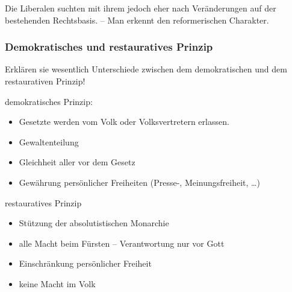 Die Liberalen suchten mit ihrem  jedoch
eher nach Veränderungen auf der bestehenden Rechtsbasis. -- Man
erkennt den reformerischen Charakter.


\subsubsection{Demokratisches und restauratives Prinzip}

\begin{aufgabe}
Erklären sie wesentlich Unterschiede zwischen dem demokratischen und
dem restaurativen Prinzip! 
\end{aufgabe}

\noindent demokratisches Prinzip:

\begin{itemize}
\item Gesetzte werden vom Volk oder Volksvertretern erlassen.
\item Gewaltenteilung
\item Gleichheit aller vor dem Gesetz
\item Gewährung persönlicher Freiheiten (Presse-, Meinungsfreiheit,
\dots) 
\end{itemize}

\noindent restauratives Prinzip

\begin{itemize}
\item Stützung der absolutistischen Monarchie
\item alle Macht beim Fürsten -- Verantwortung nur vor Gott
\item Einschränkung persönlicher Freiheit
\item keine Macht im Volk 
\end{itemize}

\endinput

